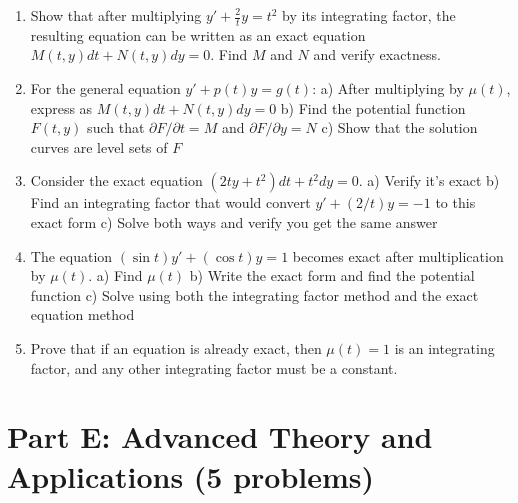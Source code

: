 \documentclass[12pt]{article}
\begin{document}
\begin{enumerate}[resume]
\item Show that after multiplying $y' + \frac{2}{t}y = t^2$ by its integrating factor, the resulting equation can be written as an exact equation $M(t,y)dt + N(t,y)dy = 0$. Find $M$ and $N$ and verify exactness.

\item For the general equation $y' + p(t)y = g(t)$:
   a) After multiplying by $\mu(t)$, express as $M(t,y)dt + N(t,y)dy = 0$
   b) Find the potential function $F(t,y)$ such that $\partial F/\partial t = M$ and $\partial F/\partial y = N$
   c) Show that the solution curves are level sets of $F$

\item Consider the exact equation $(2ty + t^2)dt + t^2dy = 0$.
   a) Verify it's exact
   b) Find an integrating factor that would convert $y' + (2/t)y = -1$ to this exact form
   c) Solve both ways and verify you get the same answer

\item The equation $(\sin t)y' + (\cos t)y = 1$ becomes exact after multiplication by $\mu(t)$.
   a) Find $\mu(t)$
   b) Write the exact form and find the potential function
   c) Solve using both the integrating factor method and the exact equation method

\item Prove that if an equation is already exact, then $\mu(t) = 1$ is an integrating factor, and any other integrating factor must be a constant.
\end{enumerate}

\section*{Part E: Advanced Theory and Applications (5 problems)}
\end{document}

